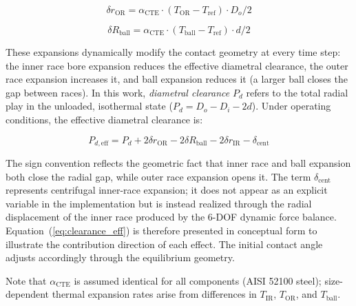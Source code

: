 \documentclass[applsci,article,submit,pdftex,moreauthors]{Definitions/mdpi}
\begin{document}
\begin{linenomath}
\begin{equation}
    \delta r_{\text{OR}} = \alpha_{\text{CTE}} \cdot (T_{\text{OR}} - T_{\text{ref}}) \cdot D_o/2
    \label{eq:exp_or}
\end{equation}
\end{linenomath}

\begin{linenomath}
\begin{equation}
    \delta R_{\text{ball}} = \alpha_{\text{CTE}} \cdot (T_{\text{ball}} - T_{\text{ref}}) \cdot d/2
    \label{eq:exp_ball}
\end{equation}
\end{linenomath}

These expansions dynamically modify the contact geometry at every time step: the inner race bore expansion reduces the effective diametral clearance, the outer race expansion increases it, and ball expansion reduces it (a larger ball closes the gap between races). In this work, \emph{diametral clearance} $P_d$ refers to the total radial play in the unloaded, isothermal state ($P_d = D_o - D_i - 2d$). Under operating conditions, the effective diametral clearance is:

\begin{linenomath}
\begin{equation}
    P_{d,\text{eff}} = P_d + 2\delta r_{\text{OR}} - 2\delta R_{\text{ball}} - 2\delta r_{\text{IR}} - \delta_{\text{cent}}
    \label{eq:clearance_eff}
\end{equation}
\end{linenomath}

The sign convention reflects the geometric fact that inner race and ball expansion both close the radial gap, while outer race expansion opens it. The term $\delta_{\text{cent}}$ represents centrifugal inner-race expansion; it does not appear as an explicit variable in the implementation but is instead realized through the radial displacement of the inner race produced by the 6-DOF dynamic force balance. Equation~(\ref{eq:clearance_eff}) is therefore presented in conceptual form to illustrate the contribution direction of each effect. The initial contact angle adjusts accordingly through the equilibrium geometry.

Note that $\alpha_{\text{CTE}}$ is assumed identical for all components (AISI 52100 steel); size-dependent thermal expansion rates arise from differences in $T_{\text{IR}}$, $T_{\text{OR}}$, and $T_{\text{ball}}$.
\end{document}
